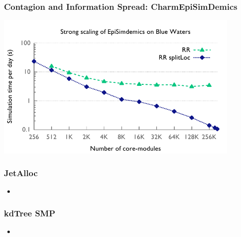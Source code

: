 \begin{frame}
\frametitle{Contagion and Information Spread: CharmEpiSimDemics}
\begin{center}
\includegraphics[width=0.9\textwidth]{../figures/simdemics_strong_scaling.pdf}
\end{center}
\end{frame}


\begin{frame}
\frametitle{JetAlloc}
%
\begin{itemize}
\item
\end{itemize}
%
\end{frame}

\begin{frame}
\frametitle{kdTree SMP}
\begin{itemize}
\item
\end{itemize}
%
\end{frame}

